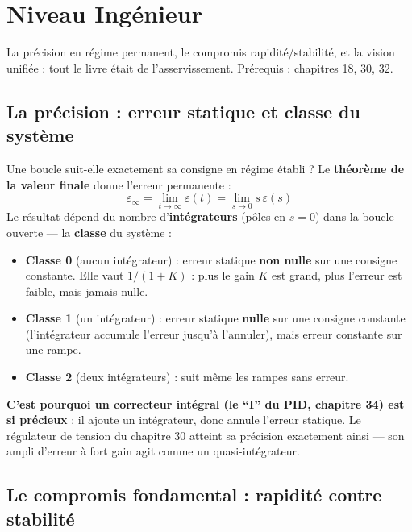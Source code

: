 \documentclass[12pt,a4paper,twoside]{book}
\begin{document}
\section{Niveau Ingénieur}

\begin{ingenieur}
La précision en régime permanent, le compromis rapidité/stabilité, et la vision unifiée : tout le livre était de l'asservissement. Prérequis : chapitres 18, 30, 32.
\end{ingenieur}

\subsection{La précision : erreur statique et classe du système}

\begin{formule}
Une boucle suit-elle exactement sa consigne en régime établi ? Le \textbf{théorème de la valeur finale} donne l'erreur permanente :
\[
\varepsilon_\infty = \lim_{t\to\infty}\varepsilon(t) = \lim_{s\to 0} s\,\varepsilon(s)
\]
Le résultat dépend du nombre d'\textbf{intégrateurs} (pôles en $s = 0$) dans la boucle ouverte --- la \textbf{classe} du système :
\begin{itemize}[nosep]
\item \textbf{Classe 0} (aucun intégrateur) : erreur statique \textbf{non nulle} sur une consigne constante. Elle vaut $1/(1 + K)$ : plus le gain $K$ est grand, plus l'erreur est faible, mais jamais nulle.
\item \textbf{Classe 1} (un intégrateur) : erreur statique \textbf{nulle} sur une consigne constante (l'intégrateur accumule l'erreur jusqu'à l'annuler), mais erreur constante sur une rampe.
\item \textbf{Classe 2} (deux intégrateurs) : suit même les rampes sans erreur.
\end{itemize}
\textbf{C'est pourquoi un correcteur intégral (le ``I'' du PID, chapitre 34) est si précieux} : il ajoute un intégrateur, donc annule l'erreur statique. Le régulateur de tension du chapitre 30 atteint sa précision exactement ainsi --- son ampli d'erreur à fort gain agit comme un quasi-intégrateur.
\end{formule}

\subsection{Le compromis fondamental : rapidité contre stabilité}
\end{document}
